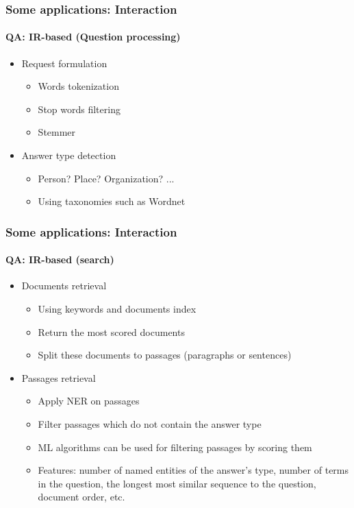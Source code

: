 \documentclass[xcolor=table]{beamer}
\begin{document}
\begin{frame}
	\frametitle{Some applications: Interaction}
	\framesubtitle{QA: IR-based (Question processing)}
	
	\begin{itemize}
		\item Request formulation
		\begin{itemize}
			\item Words tokenization
			\item Stop words filtering
			\item Stemmer  
		\end{itemize}
	    \item Answer type detection
	    \begin{itemize}
	    	\item Person? Place? Organization? ...
	    	\item Using taxonomies such as Wordnet  
	    \end{itemize}
	\end{itemize}
	
\end{frame}

\begin{frame}
	\frametitle{Some applications: Interaction}
	\framesubtitle{QA: IR-based (search)}
	
	\begin{itemize}
		\item Documents retrieval
		\begin{itemize}
			\item Using keywords and documents index
			\item Return the most scored documents
			\item Split these documents to passages (paragraphs or sentences)
		\end{itemize}
		\item Passages retrieval
		\begin{itemize}
			\item Apply NER on passages
			\item Filter passages which do not contain the answer type
			\item ML algorithms can be used for filtering passages by scoring them
			\item Features: number of named entities of the answer's type, number of terms in the question, the longest most similar sequence to the question, document order, etc.
		\end{itemize}
	\end{itemize}
	
\end{frame}
\end{document}

